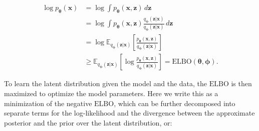 \documentclass[11pt,a4paper,oneside]{book}
\begin{document}
\begin{doublespace}
\begin{appendices}
\begin{subequations}
\begin{align}
    \log p_{\boldsymbol{\theta}}(\mathbf{x}) &= \log \int p_{\boldsymbol{\theta}}(\mathbf{x}, \mathbf{z}) \, d\mathbf{z} \\
    &= \log \int p_{\boldsymbol{\theta}}(\mathbf{x}, \mathbf{z}) \frac{q_{\boldsymbol{\phi}}(\mathbf{z} | \mathbf{x})}{q_{\boldsymbol{\phi}}(\mathbf{z} | \mathbf{x})} \, d\mathbf{z} \\
    &= \log \mathbb{E}_{q_{\boldsymbol{\phi}}(\mathbf{z} | \mathbf{x})}\left[\frac{p_{\boldsymbol{\theta}}(\mathbf{x}, \mathbf{z})}{q_{\boldsymbol{\phi}}(\mathbf{z} | \mathbf{x})}\right] \\
    &\geq \mathbb{E}_{    q_{\boldsymbol{\phi}}(\mathbf{z} | \mathbf{x})}\left[\log\frac{p_{\boldsymbol{\theta}}(\mathbf{x}, \mathbf{z})}{q_{\boldsymbol{\phi}}(\mathbf{z} | \mathbf{x})}\right] = \mathrm{ELBO}(\boldsymbol{\theta}, \boldsymbol{\phi}).
\end{align}
\end{subequations}

To learn the latent distribution given the model and the data, the $\mathrm{ELBO}$ is then maximized to optimize the model parameters. Here we write this as a minimization of the negative $\mathrm{ELBO}$, which can be further decomposed into separate terms for the log-likelihood and the divergence between the approximate posterior and the prior over the latent distribution, or:


\end{appendices}
\end{doublespace}
\end{document}
